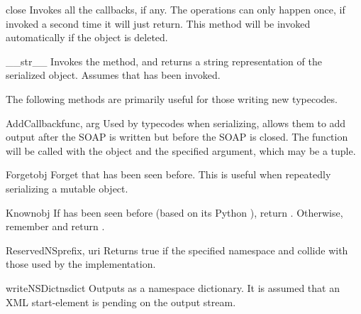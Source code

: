 \begin{methoddesc}{close}{}
Invokes all the callbacks, if any.  The  operations can only
happen once, if invoked a second time it will just return. This method will be
invoked automatically if the object is deleted.
\end{methoddesc}


\begin{methoddesc}{__str__}{}
Invokes the  method, and returns a string representation of the
serialized object.  Assumes that  has been invoked. 
\end{methoddesc}

The following methods are primarily useful for those writing new typecodes.

\begin{methoddesc}{AddCallback}{func, arg}
Used by typecodes when serializing, allows them to add output after
the SOAP  is written but before the SOAP  is closed.
The function 
will be called with the  object and the specified 
argument, which may be a tuple.
\end{methoddesc}

\begin{methoddesc}{Forget}{obj}
Forget that  has been seen before.
This is useful when repeatedly serializing a mutable object.
\end{methoddesc}

\begin{methoddesc}{Known}{obj}
If  has been seen before (based on its Python ), return
.  Otherwise, remember  and return .
\end{methoddesc}

\begin{methoddesc}{ReservedNS}{prefix, uri}
Returns true if the specified namespace  and  collide
with those used by the implementation.
\end{methoddesc}

\begin{methoddesc}{writeNSDict}{nsdict}
Outputs  as a namespace dictionary.
It is assumed that an XML start-element is pending on the output
stream.
\end{methoddesc}

